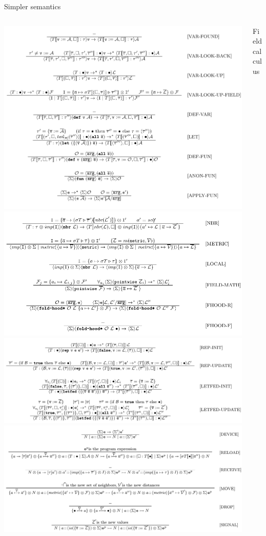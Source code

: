 \documentclass[presentation]{beamer}\mode<presentation>{\usetheme{sapere}}
\begin{document}
\begin{frame}[fragile]{Simpler semantics}
\begin{columns}
\begin{column}{6cm}
\begin{framed}
        \includegraphics[width=0.39\columnwidth]{imgs/protosem13} 
        \includegraphics[width=0.59\columnwidth]{imgs/protosem16} \\
        \includegraphics[width=0.49\columnwidth]{imgs/protosem15} 
        \includegraphics[width=0.49\columnwidth]{imgs/protosem17} 
      \end{framed}
    \end{column}
    \begin{column}{6cm}
      \centering
      Field calculus \\
      \begin{framed}

\end{framed}
\end{column}
\end{columns}
\end{frame}
\end{document}
